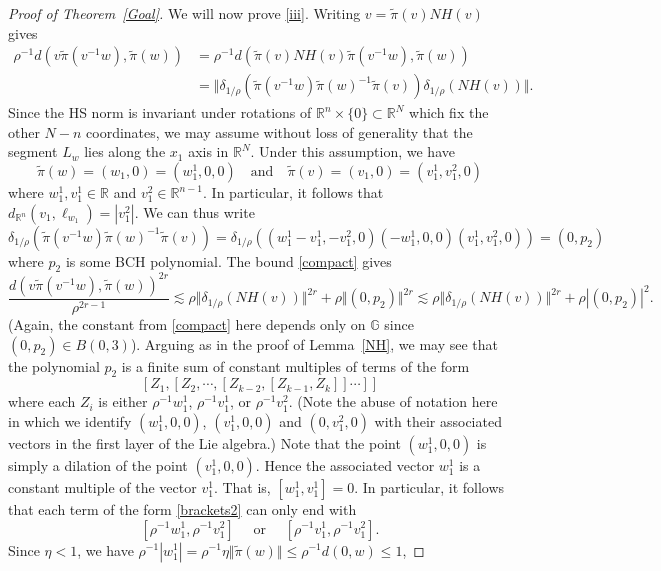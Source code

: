 \documentclass[11pt]{amsart}
\theoremstyle{definition}
\numberwithin{theorem}{section} \numberwithin{equation}{section}
\begin{document}
\begin{proof}[Proof of Theorem~\ref{Goal}]
We will now prove \eqref{iii}.
Writing $v = \tilde{\pi}(v) NH(v)$ gives
\begin{align*}
\rho^{-1} d(v\tilde{\pi}(v^{-1}w),\tilde{\pi}(w)) 
&= \rho^{-1} d(\tilde{\pi}(v) NH(v) \tilde{\pi}(v^{-1}w),\tilde{\pi}(w)) \\
&= \Vert \delta_{1/ \rho}(\tilde{\pi}(v^{-1}w) \tilde{\pi}(w)^{-1} \tilde{\pi}(v)) \delta_{1 / \rho} (NH(v)) \Vert.
\end{align*}
Since the HS norm is invariant under rotations of $\mathbb{R}^n \times \{ 0 \} \subset \mathbb{R}^N$
which fix the other $N-n$ coordinates,
we may assume without loss of generality that the segment $L_w$ lies along the $x_1$ axis in $\mathbb{R}^N$.
Under this assumption, we have 
$$
\tilde{\pi}(w) = (w_1,0) = (w_1^1,0,0) 
\quad \text{and} \quad
\tilde{\pi}(v) = (v_1,0) = (v_1^1,v_1^2,0)
$$
where $w_1^1,v_1^1 \in \mathbb{R}$ and $v_1^2 \in \mathbb{R}^{n-1}$.
In particular, it follows that $d_{\mathbb{R}^n}(v_1,\ell_{w_1}) = |v_1^2|$.
We can thus write
$$
\delta_{1/ \rho}(\tilde{\pi}(v^{-1}w) \tilde{\pi}(w)^{-1} \tilde{\pi}(v))
= \delta_{1/ \rho}( (w_1^1 - v_1^1, -v_1^2, 0)(-w_1^1,0,0)(v_1^1, v_1^2,0))
= (0, p_2 )
$$
where $p_2$ is some BCH polynomial.
The bound \eqref{compact} gives
$$
\frac{d(v\tilde{\pi}(v^{-1}w),\tilde{\pi}(w))^{2r}}{\rho^{2r-1}}
\lesssim \rho \Vert \delta_{1/\rho}(NH(v)) \Vert^{2r} + \rho \Vert (0,p_2) \Vert^{2r}
\lesssim \rho \Vert \delta_{1/\rho}(NH(v)) \Vert^{2r} + \rho | (0,p_2) |^{2}.
$$
(Again, the constant from \eqref{compact} here depends only on $\mathbb{G}$ 
since $(0,p_2) \in B(0,3)$).
Arguing as in the proof of Lemma~\ref{NH}, 
we may see that the polynomial $p_2$ is a finite sum of constant multiples of 
terms of the form 
\begin{equation}
\label{brackets2}
[Z_1,[Z_2,\cdots,[Z_{k-2},[Z_{k-1},Z_k]]\cdots]]
\end{equation}
where each $Z_i$ is either $\rho^{-1} w_1^1$, $\rho^{-1}v_1^1$, or $\rho^{-1}v_1^2$.
(Note the abuse of notation here in which we identify $(w_1^1,0,0)$, $(v_1^1,0,0)$ and $(0,v_1^2,0)$ 
with their associated vectors in the first layer of the Lie algebra.)
Note that the point $(w_1^1,0,0)$ is simply a dilation of the point $(v_1^1,0,0)$.
Hence the associated vector $w_1^1$ is a constant multiple of the vector $v_1^1$.
That is, $[w_1^1,v_1^1] = 0$.
In particular, it follows that each term of the form \eqref{brackets2} can only end with
$$
[\rho^{-1} w_1^1,\rho^{-1} v_1^2] \quad
\text{ or } \quad [\rho^{-1} v_1^1,\rho^{-1} v_1^2].
$$
Since $\eta < 1$, we have
$\rho^{-1}|w_1^1| = \rho^{-1} \eta \Vert \tilde{\pi}(w) \Vert \leq \rho^{-1}d(0, w) \leq 1$,

\end{proof}
\end{document}

